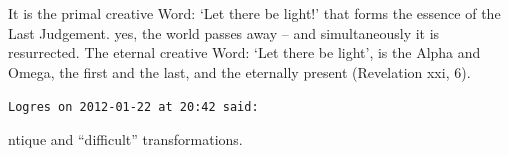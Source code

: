 \begin{footnotesize}
\begin{sffamily}
It is the primal creative Word: `Let there be light!' that forms the essence of the Last Judgement. yes, the world passes away -- and simultaneously it is resurrected. The eternal creative Word: `Let there be light', is the Alpha and Omega, the first and the last, and the eternally present (Revelation xxi, 6).

\hfill

\texttt{Logres on 2012-01-22 at 20:42 said:}

ntique and ``difficult'' transformations.


\hfill

\end{sffamily}
\end{footnotesize}

